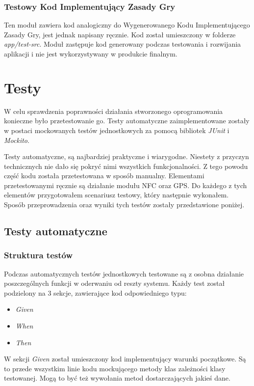 \documentclass[openright]{xmgr}
\begin{document}
\subsection*{Testowy Kod Implementujący Zasady Gry}
Ten moduł zawiera kod analogiczny do Wygenerowanego Kodu Implementującego Zasady Gry, jest jednak napisany ręcznie. Kod został umieszczony w folderze \textit{app/test-src}. Moduł zastępuje kod generowany podczas testowania i rozwijania aplikacji i nie jest wykorzystywany w produkcie finalnym.

\chapter{Testy} 

W celu sprawdzenia poprawności działania stworzonego oprogramowania konieczne było przetestowanie go.  Testy automatyczne zaimplementowane zostały w postaci mockowanych testów jednostkowych za pomocą bibliotek \textit{JUnit} i \textit{Mockito}.

Testy automatyczne, są najbardziej praktyczne i wiarygodne. Niestety z przyczyn technicznych nie dało się pokryć nimi wszystkich funkcjonalności. Z tego powodu część kodu została przetestowana w sposób manualny. Elementami przetestowanymi ręcznie są działanie modułu NFC oraz GPS. Do każdego z tych elementów przygotowałem scenariusz testowy, który następnie wykonałem. Sposób przeprowadzenia oraz wyniki tych testów zostały przedstawione poniżej.

\section{Testy automatyczne}
\subsection{Struktura testów}
Podczas  automatycznych testów jednostkowych testowane są z osobna działanie poszczególnych funkcji w oderwaniu od reszty systemu. Każdy test został podzielony na 3 sekcje, zawierające kod odpowiedniego typu:
\begin{itemize}
\item \textit{Given}
\item \textit{When}
\item \textit{Then}
\end{itemize}

W sekcji \textit{Given} został umieszczony kod implementujący warunki początkowe. Są to przede wszystkim linie kodu mockującego metody klas zależności klasy testowanej. Mogą to być też wywołania metod dostarczających jakieś dane. 
\end{document}

